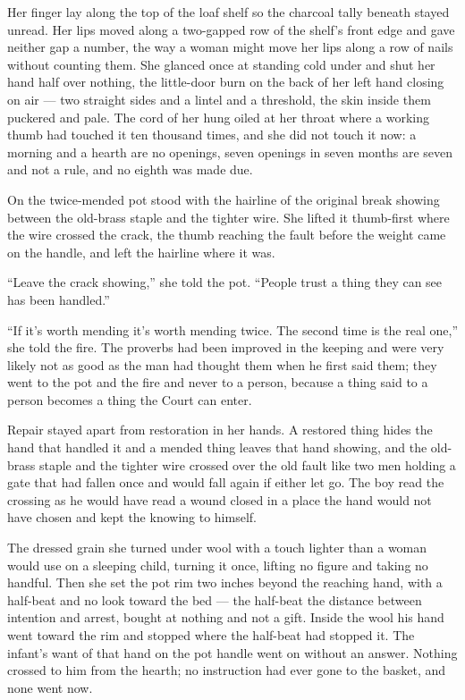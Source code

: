 Her finger lay along the top of the loaf shelf so the charcoal tally beneath stayed unread. Her lips moved along a two-gapped row of the shelf's front edge and gave neither gap a number, the way a woman might move her lips along a row of nails without counting them. She glanced once at  standing cold under  and shut her hand half over nothing, the little-door burn on the back of her left hand closing on air --- two straight sides and a lintel and a threshold, the skin inside them puckered and pale. The cord of her  hung oiled at her throat where a working thumb had touched it ten thousand times, and she did not touch it now: a morning and a hearth are no openings, seven openings in seven months are seven and not a rule, and no eighth was made due.

On  the twice-mended pot stood with the hairline of the original break showing between the old-brass staple and the tighter wire. She lifted it thumb-first where the wire crossed the crack, the thumb reaching the fault before the weight came on the handle, and left the hairline where it was.

“Leave the crack showing,” she told the pot. “People trust a thing they can see has been handled.”

“If it's worth mending it's worth mending twice. The second time is the real one,” she told the fire. The proverbs had been improved in the keeping and were very likely not as good as the man had thought them when he first said them; they went to the pot and the fire and never to a person, because a thing said to a person becomes a thing the Court can enter.

Repair stayed apart from restoration in her hands. A restored thing hides the hand that handled it and a mended thing leaves that hand showing, and the old-brass staple and the tighter wire crossed over the old fault like two men holding a gate that had fallen once and would fall again if either let go. The boy read the crossing as he would have read a wound closed in a place the hand would not have chosen and kept the knowing to himself.

The dressed grain she turned under wool with a touch lighter than a woman would use on a sleeping child, turning it once, lifting no figure and taking no handful. Then she set the pot rim two inches beyond the reaching hand, with a half-beat and no look toward the bed --- the half-beat the distance between intention and arrest, bought at nothing and not a gift. Inside the wool his hand went toward the rim and stopped where the half-beat had stopped it. The infant's want of that hand on the pot handle went on without an answer. Nothing crossed to him from the hearth; no instruction had ever gone to the basket, and none went now.

